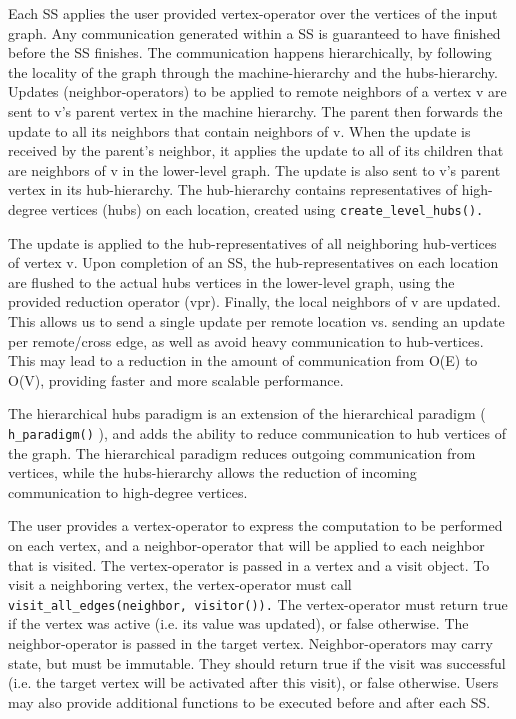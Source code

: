 Each SS applies the user provided vertex-operator over the vertices of the input graph. Any communication generated within a SS is guaranteed to have finished before the SS finishes. The communication happens hierarchically, by following the locality of the graph through the machine-hierarchy and the hubs-hierarchy. Updates (neighbor-operators) to be applied to remote neighbors of a vertex v are sent to v's parent vertex in the machine hierarchy. The parent then forwards the update to all its neighbors that contain neighbors of v. When the update is received by the parent's neighbor, it applies the update to all of its children that are neighbors of v in the lower-level graph. The update is also sent to v's parent vertex in its hub-hierarchy. The hub-hierarchy contains representatives of high-degree vertices (hubs) on each location, created using
\texttt{create\_level\_hubs().}%

 The update is applied to the hub-representatives of all neighboring hub-vertices of vertex v. Upon completion of an SS, the hub-representatives on each location are flushed to the actual hubs vertices in the lower-level graph, using the provided reduction operator (vpr). Finally, the local neighbors of v are updated. This allows us to send a single update per remote location vs. sending an update per remote/cross edge, as well as avoid heavy communication to hub-vertices. This may lead to a reduction in the amount of communication from O(E) to O(V), providing faster and more scalable performance.

The hierarchical hubs paradigm is an extension of the hierarchical paradigm (
\texttt{h\_paradigm()}%
), and adds the ability to reduce communication to hub vertices of the graph. The hierarchical paradigm reduces outgoing communication from vertices, while the hubs-hierarchy allows the reduction of incoming communication to high-degree vertices.

The user provides a vertex-operator to express the computation to be performed on each vertex, and a neighbor-operator that will be applied to each neighbor that is visited. The vertex-operator is passed in a vertex and a visit object. To visit a neighboring vertex, the vertex-operator must call 
\texttt{visit\_all\_edges(neighbor, visitor()).}
 The vertex-operator must return true if the vertex was active (i.e. its value was updated), or false otherwise. The neighbor-operator is passed in the target vertex. Neighbor-operators may carry state, but must be immutable. They should return true if the visit was successful (i.e. the target vertex will be activated after this visit), or false otherwise. Users may also provide additional functions to be executed before and after each SS.

